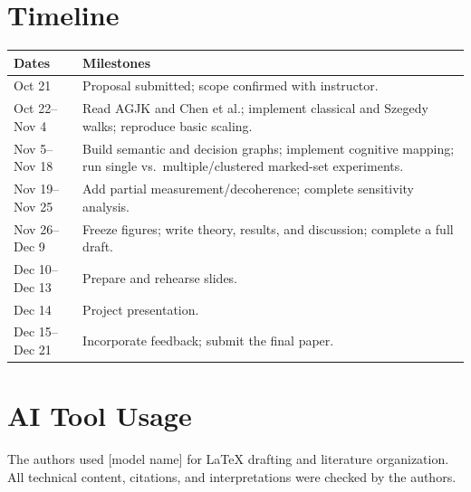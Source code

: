 \documentclass[10pt]{article}
\begin{document}
\section{Timeline}

\begin{center}
\small
\begin{tabularx}{\textwidth}{@{}lX@{}}
\toprule
Dates & Milestones \\
\midrule
Oct 21 & Proposal submitted; scope confirmed with instructor. \\
Oct 22--Nov 4 & Read AGJK and Chen et al.; implement classical and Szegedy walks; reproduce basic scaling. \\
Nov 5--Nov 18 & Build semantic and decision graphs; implement cognitive mapping; run single vs.\ multiple/clustered marked-set experiments. \\
Nov 19--Nov 25 & Add partial measurement/decoherence; complete sensitivity analysis. \\
Nov 26--Dec 9 & Freeze figures; write theory, results, and discussion; complete a full draft. \\
Dec 10--Dec 13 & Prepare and rehearse slides. \\
Dec 14 & Project presentation. \\
Dec 15--Dec 21 & Incorporate feedback; submit the final paper. \\
\bottomrule
\end{tabularx}
\end{center}

\section*{AI Tool Usage}
The authors used [model name] for LaTeX drafting and literature organization. All technical content, citations, and interpretations were checked by the authors.
\end{document}
